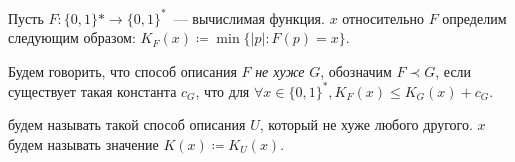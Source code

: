 






\begin{definition*}
    Пусть $F: \{0, 1\}* \to \{0, 1\}^*$~--- вычислимая функция.  $x$
    относительно $F$ определим следующим образом: $K_F(x) \coloneqq \min\{|p| : F(p) = x\}$.

    Будем говорить, что способ описания $F$ \textit{не хуже} $G$, обозначим $F \prec G$, если существует
    такая константа $c_G$, что для $\forall x \in \{0, 1\}^*, K_F(x) \le K_G(x) +
    c_G$.

     будем называть такой способ описания $U$, который не хуже любого
    другого.  $x$ будем называть значение $K(x) \coloneqq K_U(x)$.
\end{definition*}






